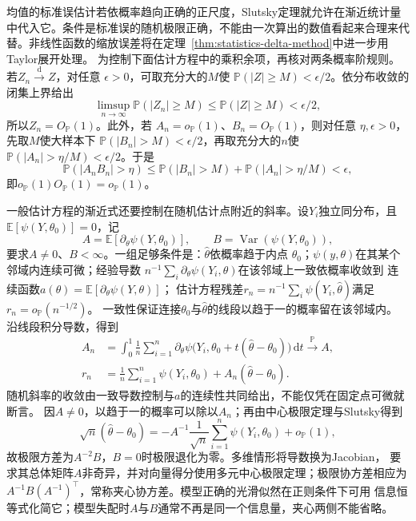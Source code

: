 均值的标准误估计若依概率趋向正确的正尺度，Slutsky定理就允许在渐近统计量中代入它。条件是标准误的随机极限正确，不能由一次算出的数值看起来合理来代替。非线性函数的缩放误差将在定理~\ref{thm:statistics-delta-method}中进一步用Taylor展开处理。
为控制下面估计方程中的乘积余项，再核对两条概率阶规则。若\(Z_n\xrightarrow{\mathrm d}Z\)，对任意
\(\epsilon>0\)，可取充分大的\(M\)使
\(\mathbb{P}(|Z|\geq M)<\epsilon/2\)。依分布收敛的闭集上界给出
\[
  \limsup_{n\to\infty}\mathbb{P}(|Z_n|\geq M)
  \leq \mathbb{P}(|Z|\geq M)<\epsilon/2,
\]
所以\(Z_n=O_{\mathbb{P}}(1)\)。此外，若
\(A_n=o_{\mathbb{P}}(1)\)、\(B_n=O_{\mathbb{P}}(1)\)，则对任意
\(\eta,\epsilon>0\)，先取\(M\)使大样本下
\(\mathbb{P}(|B_n|>M)<\epsilon/2\)，再取充分大的\(n\)使
\(\mathbb{P}(|A_n|>\eta/M)<\epsilon/2\)。于是
\[
  \mathbb{P}(|A_nB_n|>\eta)
  \leq
  \mathbb{P}(|B_n|>M)
  +\mathbb{P}(|A_n|>\eta/M)
  <\epsilon,
\]
即\(o_{\mathbb{P}}(1)O_{\mathbb{P}}(1)=o_{\mathbb{P}}(1)\)。

一般估计方程的渐近式还要控制在随机估计点附近的斜率。设\(Y_i\)独立同分布，且
\(\mathbb{E}[\psi(Y,\theta_0)]=0\)，记
\[
  A=\mathbb{E}[\partial_\theta\psi(Y,\theta_0)],
  \qquad B=\operatorname{Var}(\psi(Y,\theta_0)),
\]
要求\(A\neq0\)、\(B<\infty\)。一组足够条件是：\(\widehat\theta\)依概率趋于内点
\(\theta_0\)；\(\psi(y,\theta)\)在其某个邻域内连续可微；经验导数
\(n^{-1}\sum_i\partial_\theta\psi(Y_i,\theta)\)在该邻域上一致依概率收敛到
连续函数\(a(\theta)=\mathbb E[\partial_\theta\psi(Y,\theta)]\)；
估计方程残差\(r_n=n^{-1}\sum_i\psi(Y_i,\widehat\theta)\)满足
\(r_n=o_{\mathbb P}(n^{-1/2})\)。
一致性保证连接\(\theta_0\)与\(\widehat\theta\)的线段以趋于一的概率留在该邻域内。
沿线段积分导数，得到
\[
\begin{aligned}
 A_n&=\int_0^1\frac1n\sum_{i=1}^n
  \partial_\theta\psi\bigl(Y_i,\theta_0+t(\widehat\theta-\theta_0)\bigr)\,\mathrm dt
  \xrightarrow{\mathbb P}A,\\
 r_n&=\frac1n\sum_{i=1}^n\psi(Y_i,\theta_0)+A_n(\widehat\theta-\theta_0).
\end{aligned}
\]
随机斜率的收敛由一致导数控制与\(a\)的连续性共同给出，不能仅凭在固定点可微就断言。
因\(A\neq0\)，以趋于一的概率可以除以\(A_n\)；再由中心极限定理与Slutsky得到
\[
  \sqrt n(\widehat\theta-\theta_0)
  =
  -A^{-1}\frac1{\sqrt n}\sum_{i=1}^n\psi(Y_i,\theta_0)
  +o_{\mathbb{P}}(1),
\]
故极限方差为\(A^{-2}B\)，\(B=0\)时极限退化为零。多维情形将导数换为Jacobian，
要求其总体矩阵\(A\)非奇异，并对向量得分使用多元中心极限定理；极限协方差相应为
\(A^{-1}B(A^{-1})^\top\)，常称夹心协方差。模型正确的光滑似然在正则条件下可用
信息恒等式化简它；模型失配时\(A\)与\(B\)通常不再是同一个信息量，夹心两侧不能省略。


